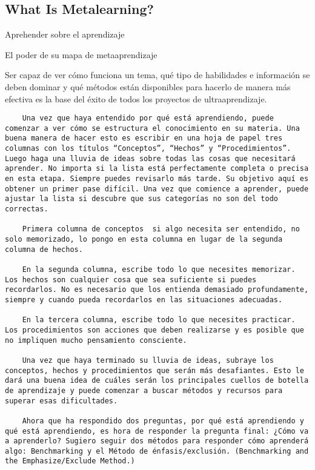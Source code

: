 \subsection{What Is Metalearning?}

Aprehender sobre el aprendizaje

El poder de su mapa de metaaprendizaje

Ser capaz de ver c\'omo funciona un tema, qu\'e tipo de habilidades e informaci\'on se deben dominar y qu\'e m\'etodos est\'an disponibles para hacerlo de manera m\'as efectiva es la base del \'exito de todos los proyectos de ultraaprendizaje.

\begin{verbatim}
	Una vez que haya entendido por qué está aprendiendo, puede comenzar a ver cómo se estructura el conocimiento en su materia. Una buena manera de hacer esto es escribir en una hoja de papel tres columnas con los títulos “Conceptos”, “Hechos” y “Procedimientos”. Luego haga una lluvia de ideas sobre todas las cosas que necesitará aprender. No importa si la lista está perfectamente completa o precisa en esta etapa. Siempre puedes revisarlo más tarde. Su objetivo aquí es obtener un primer pase difícil. Una vez que comience a aprender, puede ajustar la lista si descubre que sus categorías no son del todo correctas.
	
	Primera columna de conceptos  si algo necesita ser entendido, no solo memorizado, lo pongo en esta columna en lugar de la segunda columna de hechos.
	
	En la segunda columna, escribe todo lo que necesites memorizar. Los hechos son cualquier cosa que sea suficiente si puedes recordarlos. No es necesario que los entienda demasiado profundamente, siempre y cuando pueda recordarlos en las situaciones adecuadas. 
	
	En la tercera columna, escribe todo lo que necesites practicar. Los procedimientos son acciones que deben realizarse y es posible que no impliquen mucho pensamiento consciente.
	
	Una vez que haya terminado su lluvia de ideas, subraye los conceptos, hechos y procedimientos que serán más desafiantes. Esto le dará una buena idea de cuáles serán los principales cuellos de botella de aprendizaje y puede comenzar a buscar métodos y recursos para superar esas dificultades.
	
	Ahora que ha respondido dos preguntas, por qué está aprendiendo y qué está aprendiendo, es hora de responder la pregunta final: ¿Cómo va a aprenderlo? Sugiero seguir dos métodos para responder cómo aprenderá algo: Benchmarking y el Método de énfasis/exclusión. (Benchmarking and the Emphasize/Exclude Method.)
	

\end{verbatim}

